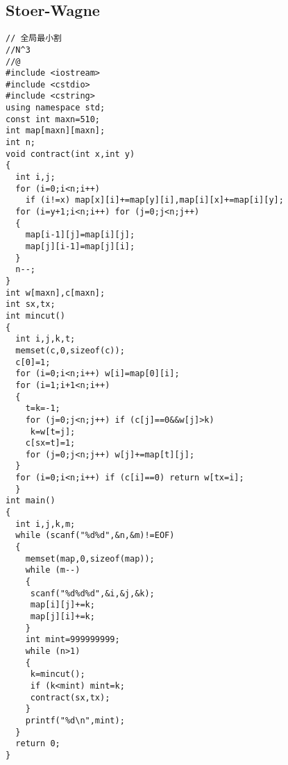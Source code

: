 \subsection{Stoer-Wagne}
\begin{lstlisting}[language={}]
// 全局最小割
//N^3
//@
#include <iostream>
#include <cstdio>
#include <cstring>
using namespace std;
const int maxn=510;
int map[maxn][maxn];
int n;
void contract(int x,int y)
{
  int i,j;
  for (i=0;i<n;i++)
    if (i!=x) map[x][i]+=map[y][i],map[i][x]+=map[i][y];
  for (i=y+1;i<n;i++) for (j=0;j<n;j++)
  {
    map[i-1][j]=map[i][j];
    map[j][i-1]=map[j][i];
  }
  n--;
}
int w[maxn],c[maxn];
int sx,tx;
int mincut()
{
  int i,j,k,t;
  memset(c,0,sizeof(c));
  c[0]=1;
  for (i=0;i<n;i++) w[i]=map[0][i];
  for (i=1;i+1<n;i++)
  {
    t=k=-1;
    for (j=0;j<n;j++) if (c[j]==0&&w[j]>k)
     k=w[t=j];
    c[sx=t]=1;
    for (j=0;j<n;j++) w[j]+=map[t][j];
  }
  for (i=0;i<n;i++) if (c[i]==0) return w[tx=i];
  }
int main()
{
  int i,j,k,m;
  while (scanf("%d%d",&n,&m)!=EOF)
  { 
    memset(map,0,sizeof(map));
    while (m--)
    {
     scanf("%d%d%d",&i,&j,&k);
     map[i][j]+=k;
     map[j][i]+=k;
    }
    int mint=999999999;
    while (n>1)
    {
     k=mincut();
     if (k<mint) mint=k;
     contract(sx,tx);
    }
    printf("%d\n",mint);
  }
  return 0;
}
\end{lstlisting}
